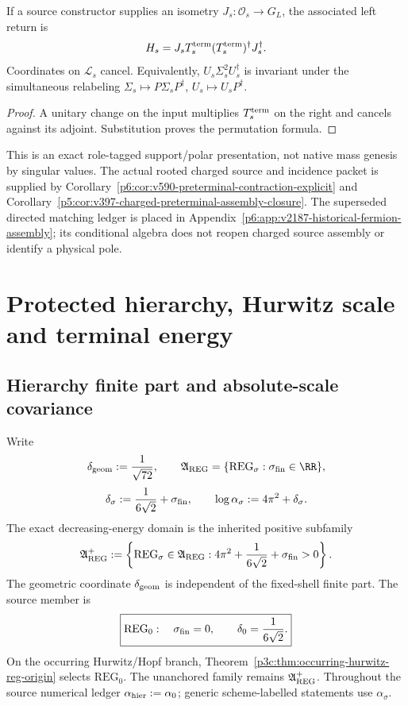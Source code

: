 \documentclass[12pt,a4paper]{article}
\begin{document}
\begin{corollary}
\label{p6:cor:v585-left-support-quotient}
If a source constructor supplies an isometry
$J_s:\mathcal O_s\to G_L$, the associated left return is
\[
 H_s=J_sT_s^{\rm term}(T_s^{\rm term})^\dagger J_s^\dagger.
\]
Coordinates on $\mathcal L_s$ cancel. Equivalently,
$U_s\Sigma_s^2U_s^\dagger$ is invariant under the simultaneous relabeling
$\Sigma_s\mapsto P\Sigma_sP^\dagger$, $U_s\mapsto U_sP^\dagger$.
\end{corollary}
\begin{proof}
A unitary change on the input multiplies $T_s^{\rm term}$ on the right
and cancels against its adjoint. Substitution proves the permutation formula.
\end{proof}

This is an exact role-tagged support/polar presentation, not native mass
genesis by singular values. The actual rooted charged source and incidence
packet is supplied by
Corollary~\ref{p6:cor:v590-preterminal-contraction-explicit} and
Corollary~\ref{p5:cor:v397-charged-preterminal-assembly-closure}.
The superseded directed matching ledger is placed in
Appendix~\ref{p6:app:v2187-historical-fermion-assembly}; its conditional
algebra does not reopen charged source assembly or identify a physical pole.



\section{Protected hierarchy, Hurwitz scale and terminal energy}
\label{p5b:sec:organized-hierarchy}
\subsection{Hierarchy finite part and absolute-scale covariance}
\label{p6:sec:hierarchy-scheme}

\begin{definition}
\label{p6:def:separated-defects}
Write
\[
\delta_{\rm geom}:=\frac1{\sqrt{72}},
\qquad
\mathfrak A_{\rm REG}
=
\{\mathrm{REG}_{\sigma}:\sigma_{\rm fin}\in\RR\},
\]
\[
\delta_{\sigma}
:=
\frac1{6\sqrt2}+\sigma_{\rm fin},
\qquad
\log\alpha_{\sigma}:=4\pi^2+\delta_{\sigma}.
\]
The exact decreasing-energy domain is the inherited positive subfamily
\[
 \mathfrak A_{\rm REG}^{+}
 :=\left\{\mathrm{REG}_{\sigma}\in\mathfrak A_{\rm REG}:
 4\pi^2+\frac1{6\sqrt2}+\sigma_{\rm fin}>0\right\}.
\]
The geometric coordinate \(\delta_{\rm geom}\) is independent of the
fixed-shell finite part.  The source member is
\[
\boxed{
\mathrm{REG}_0:\quad\sigma_{\rm fin}=0,
\qquad
\delta_0=\frac1{6\sqrt2}.
}
\]
On the occurring Hurwitz/Hopf branch, Theorem~\ref{p3c:thm:occurring-hurwitz-reg-origin} selects \(\mathrm{REG}_0\). The unanchored family remains \(\mathfrak A_{\rm REG}^{+}\). Throughout
the source numerical ledger \(\alpha_{\rm hier}:=\alpha_0\); generic
scheme-labelled statements use \(\alpha_{\sigma}\).
\end{definition}
\end{document}
